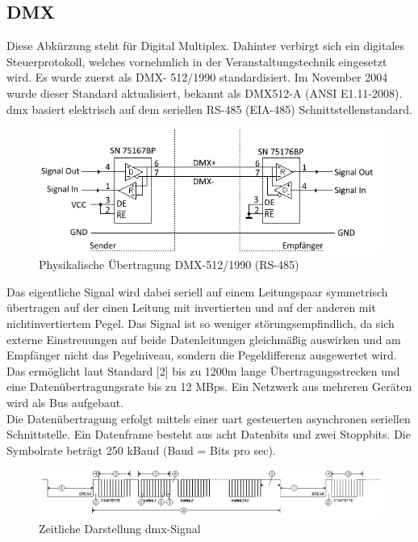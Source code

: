 \documentclass[11pt]{scrartcl}
\begin{document}
\subsection{DMX}
Diese Abkürzung steht für Digital Multiplex. Dahinter verbirgt sich ein digitales Steuerprotokoll,
welches vornehmlich in der Veranstaltungstechnik eingesetzt wird. Es wurde zuerst als DMX-
512/1990 standardisiert. Im November 2004 wurde dieser Standard aktualisiert, bekannt als
DMX512-A (ANSI E1.11-2008). \ac{dmx} basiert elektrisch auf dem seriellen RS-485 (EIA-485)
Schnittstellenstandard.\\
\begin{figure}[H]
    \includegraphics[width=\textwidth]{images/dmx.png}
    \caption{Physikalische Übertragung DMX-512/1990 (RS-485)}
\end{figure}
\noindent
Das eigentliche Signal wird dabei seriell auf einem Leitungspaar symmetrisch übertragen auf der
einen Leitung mit invertierten und auf der anderen mit nichtinvertiertem Pegel. Das Signal ist so
weniger störungsempfindlich, da sich externe Einstreuungen auf beide Datenleitungen gleichmäßig
auswirken und am Empfänger nicht das Pegelniveau, sondern die Pegeldifferenz ausgewertet wird.
Das ermöglicht laut Standard [2] bis zu 1200m lange Übertragungsstrecken und eine
Datenübertragungsrate bis zu 12 \ac{MBps}. Ein Netzwerk aus mehreren Geräten wird als Bus aufgebaut.\\
Die Datenübertragung erfolgt mittels einer \ac{uart} gesteuerten asynchronen seriellen Schnittstelle. Ein
Datenframe besteht aus acht Datenbits und zwei Stoppbits. Die Symbolrate beträgt 250 kBaud (Baud = Bits pro sec).
\begin{figure}[H]
    \includegraphics[width=\textwidth]{images/DMX_zeitlich.png}
    \caption{Zeitliche Darstellung \ac{dmx}-Signal}
\end{figure}
\end{document}
